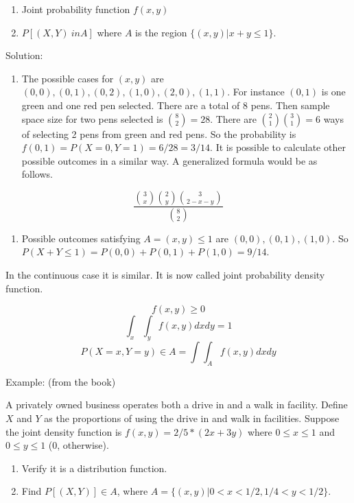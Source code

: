 \documentclass[]{book}
\providecommand{\tightlist}{%
  \setlength{\itemsep}{0pt}\setlength{\parskip}{0pt}}
\theoremstyle{definition}
\theoremstyle{definition}
\theoremstyle{definition}
\theoremstyle{remark}
\begin{document}
\begin{enumerate}
\def\labelenumi{\alph{enumi}.}
\tightlist
\item
  Joint probability function \(f(x,y)\)
\item
  \(P[(X,Y) \ in A]\) where \(A\) is the region \(\{(x,y)|x+y \le 1\}\).
\end{enumerate}

Solution:

\begin{enumerate}
\def\labelenumi{\alph{enumi}.}
\tightlist
\item
  The possible cases for \((x,y)\) are
  \((0,0),(0,1),(0,2),(1,0),(2,0),(1,1)\). For instance \((0,1)\) is one
  green and one red pen selected. There are a total of 8 pens. Then
  sample space size for two pens selected is \(\binom{8}{2} = 28\).
  There are \(\binom{2}{1}\binom{3}{1} = 6\) ways of selecting 2 pens
  from green and red pens. So the probability is
  \(f(0,1) = P(X=0,Y=1) = 6/28 = 3/14\). It is possible to calculate
  other possible outcomes in a similar way. A generalized formula would
  be as follows.
\end{enumerate}

\[\dfrac{\binom{3}{x}\binom{2}{y}\binom{3}{2-x-y}}{\binom{8}{2}}\]

\begin{enumerate}
\def\labelenumi{\alph{enumi}.}
\setcounter{enumi}{1}
\tightlist
\item
  Possible outcomes satisfying \(A = (x,y) \le 1\) are
  \((0,0),(0,1),(1,0)\). So
  \(P(X+Y \le 1) = P(0,0) + P(0,1) + P(1,0) = 9/14\).
\end{enumerate}

In the continuous case it is similar. It is now called joint probability
density function.

\[f(x,y) \ge 0\] \[\int_x\int_y f(x,y)dxdy = 1\]
\[P(X=x,Y=y) \in A = \int\int_A f(x,y)dxdy\]

Example: (from the book)

A privately owned business operates both a drive in and a walk in
facility. Define \(X\) and \(Y\) as the proportions of using the drive
in and walk in facilities. Suppose the joint density function is
\(f(x,y) = 2/5*(2x+3y)\) where \(0 \le x \le 1\) and \(0 \le y \le 1\)
(0, otherwise).

\begin{enumerate}
\def\labelenumi{\alph{enumi}.}
\tightlist
\item
  Verify it is a distribution function.
\item
  Find \(P[(X,Y)] \in A\), where
  \(A = \{(x,y)|0 < x < 1/2, 1/4 < y < 1/2\}\).
\end{enumerate}
\end{document}
